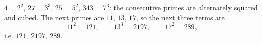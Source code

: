 $4=2^2$, $27=3^3$, $25=5^2$, $343=7^3$: the consecutive primes are alternately squared and cubed. The next primes are $11$, $13$, $17$, so the next three terms are
\[11^2=121,\qquad13^3=2197,\qquad17^2=289,\]
i.e. $\boxed{121,\ 2197,\ 289}$.
